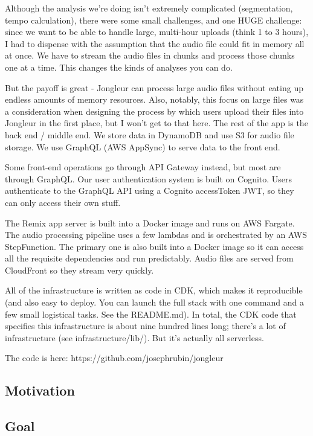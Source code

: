 \documentclass{article}
\begin{document}
Although the analysis we're doing isn't extremely complicated (segmentation, tempo calculation), there were some small challenges, and one HUGE challenge: since we want to be able to handle large, multi-hour uploads (think 1 to 3 hours), I had to dispense with the assumption that the audio file could fit in memory all at once. 
We have to stream the audio files in chunks and process those chunks one at a time.
This changes the kinds of analyses you can do.

But the payoff is great - Jongleur can process large audio files without eating up endless amounts of memory resources.
Also, notably, this focus on large files was a consideration when designing the process by which users upload their files into Jongleur in the first place, but I won't get to that here.
The rest of the app is the back end / middle end. We store data in DynamoDB and use S3 for audio file storage.
We use GraphQL (AWS AppSync) to serve data to the front end.

Some front-end operations go through API Gateway instead, but most are through GraphQL.
Our user authentication system is built on Cognito.
Users authenticate to the GraphQL API using a Cognito accessToken JWT, so they can only access their own stuff.

The Remix app server is built into a Docker image and runs on AWS Fargate.
The audio processing pipeline uses a few lambdas and is orchestrated by an AWS StepFunction.
The primary one is also built into a Docker image so it can access all the requisite dependencies and run predictably.
Audio files are served from CloudFront so they stream very quickly.

All of the infrastructure is written as code in CDK, which makes it reproducible (and also easy to deploy. You can launch the full stack with one command and a few small logistical tasks. See the README.md).
In total, the CDK code that specifies this infrastructure is about nine hundred lines long; there's a lot of infrastructure (see infrastructure/lib/).
But it's actually all serverless.

The code is here: https://github.com/josephrubin/jongleur

\subsection{Motivation} 


\subsection{Goal}
\end{document}
